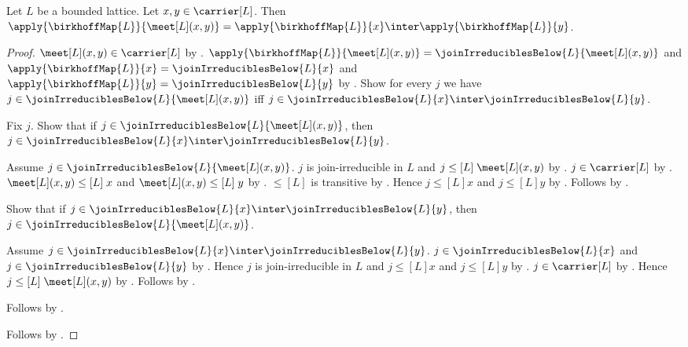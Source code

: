 \begin{theorem}\label{birkhoff_map_meet}
    Let $L$ be a bounded lattice.
    Let $x,y\in\carrier[L]$.
    Then $\apply{\birkhoffMap{L}}{\meet[L](x,y)}
        =\apply{\birkhoffMap{L}}{x}\inter\apply{\birkhoffMap{L}}{y}$.
\end{theorem}
\begin{proof}
    $\meet[L](x,y)\in\carrier[L]$ by .
    $\apply{\birkhoffMap{L}}{\meet[L](x,y)}
        =\joinIrreduciblesBelow{L}{\meet[L](x,y)}$ and
        $\apply{\birkhoffMap{L}}{x}=\joinIrreduciblesBelow{L}{x}$ and
        $\apply{\birkhoffMap{L}}{y}=\joinIrreduciblesBelow{L}{y}$ by
        .
    Show for every $j$ we have
        $j\in\joinIrreduciblesBelow{L}{\meet[L](x,y)}$ iff
        $j\in\joinIrreduciblesBelow{L}{x}\inter
            \joinIrreduciblesBelow{L}{y}$.
    \begin{subproof}
        Fix $j$.
        Show that if
            $j\in\joinIrreduciblesBelow{L}{\meet[L](x,y)}$, then
            $j\in\joinIrreduciblesBelow{L}{x}\inter
                \joinIrreduciblesBelow{L}{y}$.
        \begin{subproof}
            Assume $j\in\joinIrreduciblesBelow{L}{\meet[L](x,y)}$.
            $j$ is join-irreducible in $L$ and
                $j\mathrel{\leq[L]}\meet[L](x,y)$ by
                .
            $j\in\carrier[L]$ by .
            $\meet[L](x,y)\mathrel{\leq[L]}x$ and
                $\meet[L](x,y)\mathrel{\leq[L]}y$ by .
            $\leq[L]$ is transitive by
                .
            Hence $j\mathrel{\leq[L]}x$ and
                $j\mathrel{\leq[L]}y$ by .
            Follows by
                .
        \end{subproof}
        Show that if $j\in\joinIrreduciblesBelow{L}{x}\inter
            \joinIrreduciblesBelow{L}{y}$, then
            $j\in\joinIrreduciblesBelow{L}{\meet[L](x,y)}$.
        \begin{subproof}
            Assume $j\in\joinIrreduciblesBelow{L}{x}\inter
                \joinIrreduciblesBelow{L}{y}$.
            $j\in\joinIrreduciblesBelow{L}{x}$ and
                $j\in\joinIrreduciblesBelow{L}{y}$ by
                .
            Hence $j$ is join-irreducible in $L$ and
                $j\mathrel{\leq[L]}x$ and
                $j\mathrel{\leq[L]}y$ by
                .
            $j\in\carrier[L]$ by .
            Hence $j\mathrel{\leq[L]}\meet[L](x,y)$ by
                .
            Follows by .
        \end{subproof}
        Follows by \auto.
    \end{subproof}
    Follows by .
\end{proof}

